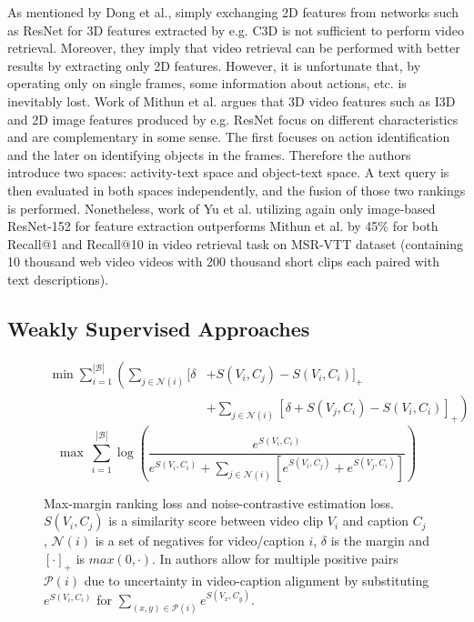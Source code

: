 As mentioned by Dong et al., simply exchanging 2D features from networks such as ResNet for 3D features extracted by e.g. C3D is not sufficient to perform video retrieval. Moreover, they imply that video retrieval can be performed with better results by extracting only 2D features. However, it is unfortunate that, by operating only on single frames, some information about actions, etc. is inevitably lost. Work of Mithun et al. \cite{Mithun2018} argues that 3D video features such as I3D and 2D image features produced by e.g. ResNet focus on different characteristics and are complementary in some sense. The first focuses on action identification and the later on identifying objects in the frames. Therefore the authors introduce two spaces: activity-text space and object-text space. A text query is then evaluated in both spaces independently, and the fusion of those two rankings is performed. Nonetheless, work of Yu et al. \cite{Yu_2018_ECCV} utilizing again only image-based ResNet-152 for feature extraction outperforms Mithun et al. by 45\% for both Recall@1 and Recall@10 in video retrieval task on MSR-VTT \cite{Xu_2016_CVPR} dataset (containing 10 thousand web video videos with 200 thousand short clips each paired with text descriptions).

\subsection{Weakly Supervised Approaches}
\begin{figure}
    \centering
    \begin{equation}\label{eg:maxmarginrankingloss}
        \begin{split}
        \min\sum_{i=1}^{|\mathcal{B}|} \left( \sum_{j\in \mathcal{N}(i)}\right. [\delta & + S(V_i,C_j) - S(V_i,C_i)]_+ \\
        & \left. + \sum_{j\in \mathcal{N}(i)} [\delta + S(V_j,C_i) - S(V_i,C_i)]_+ \right)
        \end{split}
    \end{equation}
    \begin{equation}
        \max\ \sum_{i=1}^{|\mathcal{B}|} \log \left(\frac{e^{S(V_i, C_i)}}{e^{S(V_i, C_i)}+\sum_{j \in \mathcal{N}(i)} \left[e^{S(V_i, C_j)} + e^{S(V_j, C_i)}\right]}\right)\label{eg:nceloss}
    \end{equation}
    
    \caption[Max-margin ranking loss and noise-contrastive estimation loss.]{Max-margin ranking loss and noise-contrastive estimation loss. $S(V_i,C_j)$ is a similarity score between video clip $V_i$ and caption $C_j$, $\mathcal{N}(i)$ is a set of negatives for video/caption $i$, $\delta$ is the margin and $\left[\cdot\right]_+$ is $max(0, \cdot)$. In \cite{Miech_2020_CVPR} authors allow for multiple positive pairs $\mathcal{P}(i)$ due to uncertainty in video-caption alignment by substituting $e^{S(V_i, C_i)}$ for $\sum_{(x,y)\in\mathcal{P}(i)}e^{S(V_x, C_y)}$.}
\end{figure}

